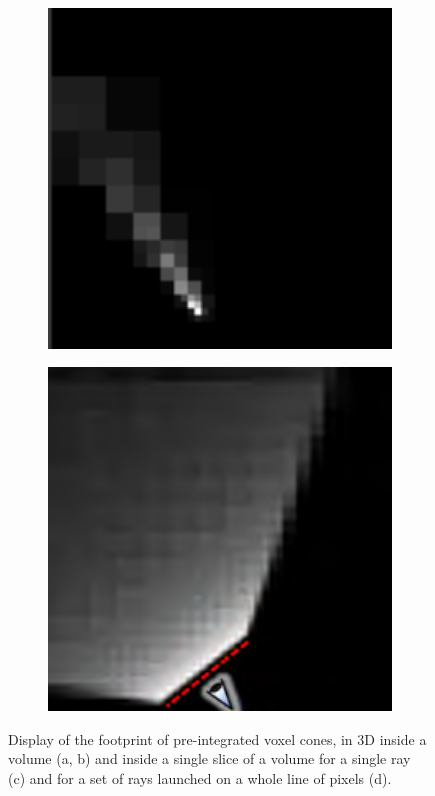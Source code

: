 \begin{figure}
\begin{subfigure}[b]{0.24\textwidth}
		\caption{}
	\end{subfigure}
	\begin{subfigure}[b]{0.24\textwidth}
		\includegraphics[width=1.0\textwidth]{graphics/vct/vct-8-3}
		\caption{}
	\end{subfigure}
	\begin{subfigure}[b]{0.24\textwidth}
		\includegraphics[width=1.0\textwidth]{graphics/vct/vct-8-4}
		\caption{}
	\end{subfigure}
	\caption{Display of the footprint of pre-integrated voxel cones, in 3D inside a volume (a, b) and inside a single slice of a volume for a single ray (c) and for a set of rays launched on a whole line of pixels (d).}
\end{figure}

